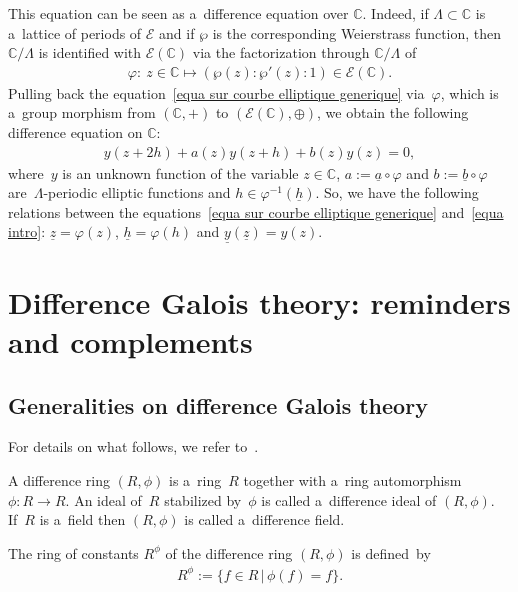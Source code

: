 \documentclass[10pt,a4paper]{amsart}
\numberwithin{equation}{section}
\begin{document}
This equation can be seen as a~dif\/ference equation over $\mathbb C$.
Indeed, if $\Lambda \subset \mathbb C$ is a~lattice of periods of $\mathcal{E}$ and if $\wp$ is the corresponding
Weierstrass function, then $\mathbb C/\Lambda$ is identif\/ied with $\mathcal{E}(\mathbb C)$ via the factorization through
$\mathbb C/\Lambda$ of
\begin{gather*}
\varphi: \ z \in \mathbb C \mapsto (\wp(z):\wp'(z):1) \in \mathcal{E}(\mathbb C).
\end{gather*}
Pulling back the equation~\eqref{equa sur courbe elliptique generique} via~$\varphi$, which is a~group morphism from
$(\mathbb C, +)$ to $(\mathcal{E}(\mathbb C),\oplus)$, we obtain the following dif\/ference equation on $\mathbb C$:
\begin{gather}
\label{equa intro}
y(z+2h) + a(z) y(z+h) + b(z)y(z) =0,
\end{gather}
where~$y$ is an unknown function of the variable $z\in \mathbb C$, $a:=\underline{a} \circ \varphi$ and
$b:=\underline{b} \circ \varphi$ are~$\Lambda$-periodic elliptic functions and ${h \in \varphi^{-1}(\underline{h})}$.
So, we have the following relations between the equations~\eqref{equa sur courbe elliptique generique} and~\eqref{equa
intro}: $\underline{z} = \varphi(z)$, $\underline{h}=\varphi(h)$ and $\underline{y}(\underline{z})= y(z)$.

\section{Dif\/ference Galois theory: reminders and complements}
\label{sec2}

\subsection{Generalities on dif\/ference Galois theory}

For details on what follows, we refer to~\cite[Chapter~1]{VdPS97}.

A dif\/ference ring $(R,\phi)$ is a~ring~$R$ together with a~ring automorphism $\phi: R \rightarrow R$.
An ideal of~$R$ stabilized by~$\phi$ is called a~dif\/ference ideal of $(R,\phi)$.
If~$R$ is a~f\/ield then $(R,\phi)$ is called a~dif\/ference f\/ield.

The ring of constants $R^{\phi}$ of the dif\/ference ring $(R,\phi)$ is def\/ined~by
\begin{gather*}
R^{\phi}:=\{f \in R \, | \, \phi(f)=f\}.
\end{gather*}
\end{document}
